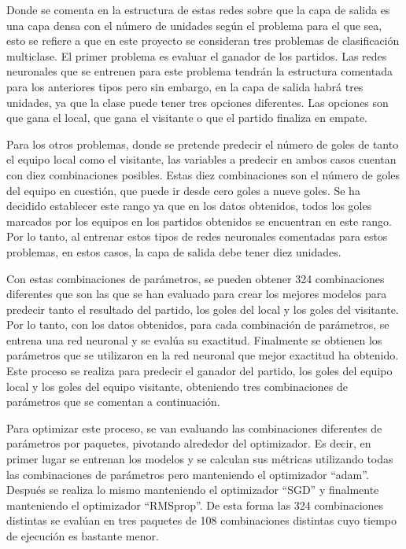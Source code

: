 Donde se comenta en la estructura de estas redes sobre que la capa de salida es una capa densa con el número de unidades según el problema para el que sea, esto se refiere a que en este proyecto se consideran tres problemas de clasificación multiclase. El primer problema es evaluar el ganador de los partidos. Las redes neuronales que se entrenen para este problema tendrán la estructura comentada para los anteriores tipos pero sin embargo, en la capa de salida habrá tres unidades, ya que la clase puede tener tres opciones diferentes. Las opciones son que gana el local, que gana el visitante o que el partido finaliza en empate.

Para los otros problemas, donde se pretende predecir el número de goles de tanto el equipo local como el visitante, las variables a predecir en ambos casos cuentan con diez combinaciones posibles. Estas diez combinaciones son el número de goles del equipo en cuestión, que puede ir desde cero goles a nueve goles. Se ha decidido establecer este rango ya que en los datos obtenidos, todos los goles marcados por los equipos en los partidos obtenidos se encuentran en este rango. Por lo tanto, al entrenar estos tipos de redes neuronales comentadas para estos problemas, en estos casos, la capa de salida debe tener diez unidades.

Con estas combinaciones de parámetros, se pueden obtener 324 combinaciones diferentes que son las que
se han evaluado para crear los mejores modelos para predecir tanto el resultado del partido, los
goles del local y los goles del visitante. Por lo tanto, con los datos obtenidos, para cada
combinación de parámetros, se entrena una red neuronal y se evalúa su exactitud. Finalmente se
obtienen los parámetros que se utilizaron en la red neuronal que mejor exactitud ha obtenido. Este
proceso se realiza para predecir el ganador del partido, los goles del equipo local y los goles del
equipo visitante, obteniendo tres combinaciones de parámetros que se comentan a continuación.

Para optimizar este proceso, se van evaluando las combinaciones diferentes de parámetros por paquetes, pivotando alrededor del optimizador. Es decir, en primer lugar se entrenan los modelos y se calculan sus métricas utilizando todas las combinaciones de parámetros pero manteniendo el optimizador ``adam''. Después se realiza lo mismo manteniendo el optimizador ``SGD'' y finalmente manteniendo el optimizador ``RMSprop''. De esta forma las 324 combinaciones distintas se evalúan en tres paquetes de 108 combinaciones distintas cuyo tiempo de ejecución es bastante menor.

